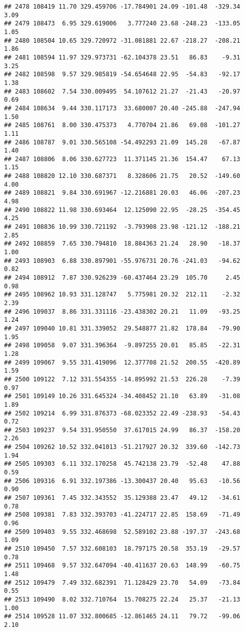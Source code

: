 \documentclass[]{article}
\begin{document}
\begin{verbatim}
## 2478 108419 11.70 329.459706 -17.784901 24.09 -101.48  -329.34  3.09
## 2479 108473  6.95 329.619006   3.777240 23.68 -248.23  -133.05  1.05
## 2480 108504 10.65 329.720972 -31.081881 22.67 -218.27  -208.21  1.86
## 2481 108594 11.97 329.973731 -62.104378 23.51   86.83    -9.31  3.25
## 2482 108598  9.57 329.985819 -54.654648 22.95  -54.83   -92.17  1.38
## 2483 108602  7.54 330.009495  54.107612 21.27  -21.43   -20.97  0.69
## 2484 108634  9.44 330.117173  33.680007 20.40 -245.88  -247.94  1.50
## 2485 108761  8.00 330.475373   4.770704 21.86   69.08  -101.27  1.11
## 2486 108787  9.01 330.565108 -54.492293 21.09  145.28   -67.87  1.40
## 2487 108806  8.06 330.627723  11.371145 21.36  154.47    67.13  1.15
## 2488 108820 12.10 330.687371   8.328606 21.75   20.52  -149.60  4.00
## 2489 108821  9.84 330.691967 -12.216881 20.03   46.06  -207.23  4.98
## 2490 108822 11.98 330.693464  12.125090 22.95  -28.25  -354.45  4.25
## 2491 108836 10.99 330.721192  -3.793908 23.98 -121.12  -188.21  2.85
## 2492 108859  7.65 330.794810  18.884363 21.24   28.90   -18.37  1.00
## 2493 108903  6.88 330.897901 -55.976731 20.76 -241.03   -94.62  0.82
## 2494 108912  7.87 330.926239 -60.437464 23.29  105.70     2.45  0.98
## 2495 108962 10.93 331.128747   5.775981 20.32  212.11    -2.32  2.39
## 2496 109037  8.86 331.331116 -23.438302 20.21   11.09   -93.25  1.24
## 2497 109040 10.81 331.339052  29.548877 21.82  178.84   -79.90  1.95
## 2498 109058  9.07 331.396364  -9.897255 20.01   85.85   -22.31  1.28
## 2499 109067  9.55 331.419096  12.377708 21.52  200.55  -420.89  1.59
## 2500 109122  7.12 331.554355 -14.895992 21.53  226.28    -7.39  0.97
## 2501 109149 10.26 331.645324 -34.408452 21.10   63.89   -31.08  1.89
## 2502 109214  6.99 331.876373 -68.023352 22.49 -238.93   -54.43  0.72
## 2503 109237  9.54 331.950550  37.617015 24.99   86.37  -158.20  2.26
## 2504 109262 10.52 332.041013 -51.217927 20.32  339.60  -142.73  1.94
## 2505 109303  6.11 332.170258  45.742138 23.79  -52.48    47.88  0.59
## 2506 109316  6.91 332.197386 -13.300437 20.40   95.63   -10.56  0.90
## 2507 109361  7.45 332.343552  35.129388 23.47   49.12   -34.61  0.78
## 2508 109381  7.83 332.393703 -41.224717 22.85  158.69   -71.49  0.96
## 2509 109403  9.55 332.468698  52.589102 23.88 -197.37  -243.68  1.09
## 2510 109450  7.57 332.608103  18.797175 20.58  353.19   -29.57  0.78
## 2511 109468  9.57 332.647094 -40.411637 20.63  148.99   -60.75  1.48
## 2512 109479  7.49 332.682391  71.128429 23.70   54.09   -73.84  0.55
## 2513 109490  8.02 332.710764  15.708275 22.24   25.37   -21.13  1.00
## 2514 109528 11.07 332.800685 -12.861465 24.11   79.72   -99.06  2.10

\end{verbatim}
\end{document}
